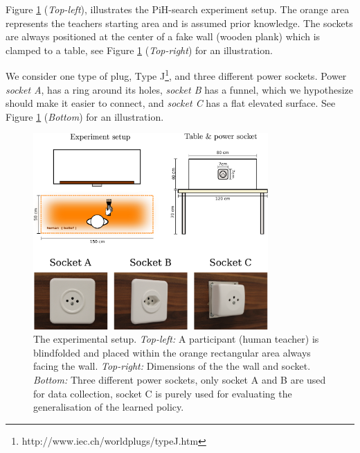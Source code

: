 

Figure \ref{fig:search_task_setup} (\textit{Top-left}), illustrates the PiH-search experiment setup. The orange area represents 
the teachers starting area and is assumed prior knowledge. The sockets are always positioned at the center of a fake wall (wooden plank) which is clamped to a table, see 
Figure \ref{fig:search_task_setup} (\textit{Top-right}) for an illustration. 

We consider one type of plug, Type J\footnote{http://www.iec.ch/worldplugs/typeJ.htm}, and three different power sockets. 
Power \textit{socket A}, has a ring around its holes, \textit{socket B} has a funnel, which we hypothesize should make 
it easier to connect, and \textit{socket C} has a flat elevated surface. See Figure \ref{fig:search_task_setup}
(\textit{Bottom}) for an illustration. 

\begin{figure}
 \centering
 \includegraphics[width=0.8\textwidth]{./ch4-PiH/Figures/Fig/experiment_setup_and_design.pdf}
 \caption{The experimental setup. \textit{Top-left:} A participant (human teacher) is blindfolded and 
    placed within the orange rectangular area always facing the wall. \textit{Top-right:} Dimensions of the 
    the wall and socket. \textit{Bottom:} Three different power sockets, only socket A and B are used for data collection, socket
    C is purely used for evaluating the generalisation of the learned policy.}
    \label{fig:search_task_setup}
\end{figure}

